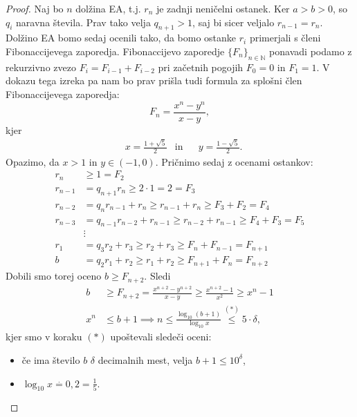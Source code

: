 \documentclass[12pt, a4paper]{article}
\begin{document}
\begin{proof}
Naj bo $n$ dolžina EA, t.j. $r_n$ je zadnji neničelni ostanek. Ker \mbox{$a>b>0$}, so $q_i$ naravna števila. Prav tako velja $q_{n+1}>1$, saj bi sicer veljalo $r_{n-1}=r_n$. Dolžino EA bomo sedaj ocenili tako, da bomo ostanke $r_i$ primerjali s členi Fibonaccijevega zaporedja. Fibonaccijevo zaporedje $\{F_n\}_{n\in \mathbb{N}}$ ponavadi podamo z rekurzivno zvezo $F_i=F_{i-1}+F_{i-2}$ pri začetnih pogojih $F_0 = 0$ in $F_1=1$. V dokazu tega izreka pa nam bo prav prišla tudi formula za splošni člen Fibonaccijevega zaporedja:
$$F_n = \frac{x^n-y^n}{x-y},$$
kjer
\begin{align*}
&x=\frac{1 + \sqrt{5}}{2} &\text{in}&  &y=\frac{1 - \sqrt{5}}{2}.
\end{align*}
Opazimo, da $x>1$ in $y\in (-1,0)$. Pričnimo sedaj z ocenami ostankov:
\begin{align*}
r_n &\geq 1 = F_2 \\
r_{n-1} &= q_{n+1} r_n \geq 2\cdot 1 = 2 = F_3 \\
r_{n-2} &=q_n r_{n-1} + r_n \geq r_{n-1} + r_n \geq F_3 + F_2 = F_4 \\
r_{n-3} &= q_{n-1} r_{n-2} + r_{n-1} \geq r_{n-2} + r_{n-1} \geq F_4 + F_3 = F_5 \\
&\vdots \\
r_1 &= q_3 r_2 + r_3 \geq r_2 + r_3 \geq F_n + F_{n-1} = F_{n+1} \\
b &= q_2 r_1 + r_2 \geq r_1 + r_2 \geq F_{n+1} + F_n = F_{n+2}
\end{align*}
Dobili smo torej oceno $b\geq F_{n+2}$. Sledi
\begin{align*}
b &\geq F_{n+2} = \frac{x^{n+2}-y^{n+2}}{x-y} \geq \frac{x^{n+2} -1}{x^2} \geq x^n - 1 \\
x^n &\leq b+1 \implies n\leq \frac{\log_{10}{(b+1)}}{\log_{10}x} \overset{(*)}{\leq} 5 \cdot \delta,
\end{align*}
kjer smo v koraku $(*)$ upoštevali sledeči oceni:
\begin{itemize}
\item če ima število $b$ $\delta$ decimalnih mest, velja $b+1\leq 10^{\delta}$,
\item $\log_{10}x \overset{.}{=} 0,2 = \frac{1}{5}$.
\end{itemize}
\end{proof}
\end{document}
